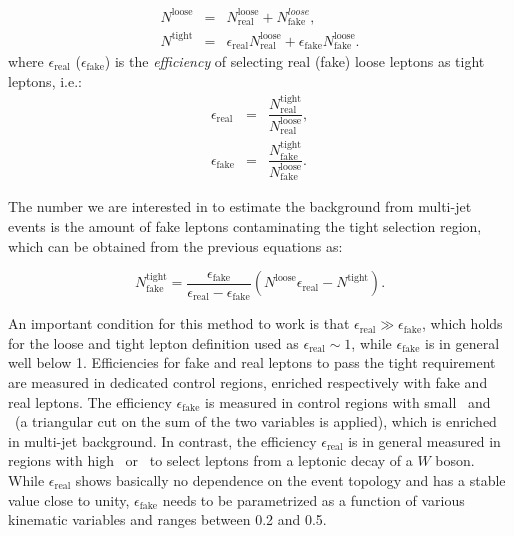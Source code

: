 \begin{eqnarray}
\label{eqn:intro-mm-Nloose}
N^\mathrm{loose} & = & N^\mathrm{loose}_\mathrm{real} + N^{loose}_\mathrm{fake}, \\
\label{eqn:intro-mm-Ntight}
N^\mathrm{tight} & = & \epsilon_\mathrm{real}N^\mathrm{loose}_\mathrm{real} + \epsilon_\mathrm{fake}N^\mathrm{loose}_\mathrm{fake}.
\end{eqnarray}
where $\epsilon_\mathrm{real}$ ($\epsilon_\mathrm{fake}$) is the 
{\it efficiency} of selecting real (fake) loose leptons as tight leptons, i.e.:
\begin{eqnarray}
\label{eqn:intro-mm-real}
\epsilon_\mathrm{real} & = & \dfrac{N^\mathrm{tight}_\mathrm{real}}{N^\mathrm{loose}_\mathrm{real}}, \\
\label{eqn:intro-mm-fake}
\epsilon_\mathrm{fake} & = & \dfrac{N^\mathrm{tight}_\mathrm{fake}}{N^\mathrm{loose}_\mathrm{fake}}.
\end{eqnarray}


The number we are interested in to estimate the background from
multi-jet events is the amount of fake leptons contaminating the 
tight selection region, which can be obtained from
the previous equations as:

\begin{equation}
N^\mathrm{tight}_\mathrm{fake} = \frac{\epsilon_\mathrm{fake}}{\epsilon_\mathrm{real} - \epsilon_\mathrm{fake}}(N^\mathrm{loose} \epsilon_\mathrm{real} - N^\mathrm{tight}).
\label{eqn:intro-mm-tight_fake}
\end{equation}

An important condition for this method to work is that 
$\epsilon_\mathrm{real} \gg \epsilon_\mathrm{fake}$, which 
holds for the loose and tight lepton definition used
as $\epsilon_\mathrm{real}\sim 1$, while $\epsilon_\mathrm{fake}$
is in general well below 1.
Efficiencies for fake and real leptons to pass the 
tight requirement are measured in dedicated control regions, 
enriched respectively with fake and real leptons.
The efficiency $\epsilon_\mathrm{fake}$ is measured in control regions
with small \met\ and \mtw\ (a triangular cut on the
sum of the two variables is applied), which is
enriched in multi-jet background. In contrast,
the efficiency $\epsilon_\mathrm{real}$ is in general measured 
in regions with high \met\ or \mtw\
to select leptons from a leptonic decay of a $W$
boson.
While $\epsilon_\mathrm{real}$ shows basically
no dependence on the event topology and has
a stable value close to unity,  $\epsilon_\mathrm{fake}$ 
needs to be parametrized 
as a function of various kinematic variables
and ranges between 0.2 and 0.5.

